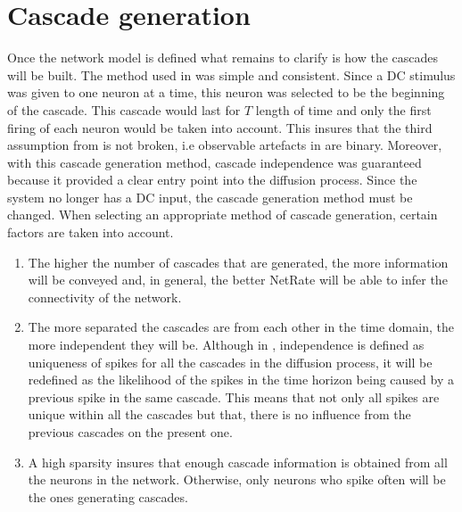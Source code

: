


\section{Cascade generation}\label{sec:simulating_cascade_generation}

Once the network model is defined what remains to clarify is how the cascades will be built. The method used in \cite{alexandru2018estimating} was simple and consistent. Since a DC stimulus was given to one neuron at a time, this neuron was selected to be the beginning of the cascade. This cascade would last for \(T\) length of time and only the first firing of each neuron would be taken into account. This insures that the third assumption from \cite{rodriguez2011uncovering} is not broken, i.e observable artefacts in are binary. Moreover, with this cascade generation method, cascade independence was guaranteed because it provided a clear entry point into the diffusion process. Since the system no longer has a DC input, the cascade generation method must be changed. When selecting an appropriate method of cascade generation, certain factors are taken into account.
\begin{enumerate}
\item The higher the number of cascades that are generated, the more information will be conveyed and, in general, the better NetRate will be able to infer the connectivity of the network. 
\item The more separated the cascades are from each other in the time domain, the more independent they will be. Although in \cite{rodriguez2011uncovering}, independence is defined as uniqueness of spikes for all the cascades in the diffusion process, it will be redefined as the likelihood of the spikes in the time horizon being caused by a previous spike in the same cascade. This means that not only all spikes are unique within all the cascades but that, there is no influence from the previous cascades on the present one.
\item A high sparsity insures that enough cascade information is obtained from all the neurons in the network. Otherwise, only neurons who spike often will be the ones generating cascades.
\end{enumerate}

